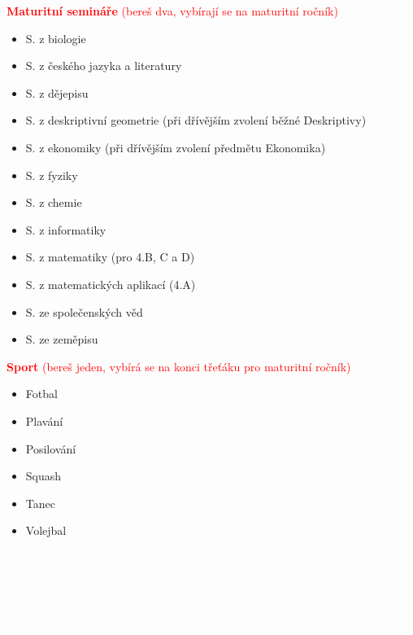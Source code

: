 \documentclass{article}
\begin{document}
\begin{multicols}{2}
  \vfill\null

  \columnbreak

  \noindent \textcolor{red}{\textbf{Maturitní semináře} (bereš dva, vybírají se na maturitní ročník)}
  \begin{itemize}
    \item S. z biologie
    \item S. z českého jazyka a literatury
    \item S. z dějepisu
    \item S. z deskriptivní geometrie (při
    dřívějším zvolení běžné Deskriptivy)
    \item S. z ekonomiky (při dřívějším zvolení předmětu Ekonomika)
    \item S. z fyziky
    \item S. z chemie
    \item S. z informatiky
    \item S. z matematiky (pro 4.B, C a D)
    \item S. z matematických aplikací (4.A)
    \item S. ze společenských věd
    \item S. ze zeměpisu
  \end{itemize}

  \noindent \textcolor{red}{\textbf{Sport} (bereš jeden, vybírá se na konci třeťáku pro maturitní ročník)}
  \begin{itemize}
    \item Fotbal
    \item Plavání
    \item Posilování
    \item Squash
    \item Tanec
    \item Volejbal
  \end{itemize}

  \begin{tcolorbox}[colback=red,boxrule=0pt, sharp corners]
    \textcolor{white}{\footnotesize Poznámky:
     některé předměty jsou označeny pro třídy X.A
      nebo ostatní. Osnovy matematické a všeobecné třídy se trochu liší, a proto jim musí být
      uzpůsoben i repertoár volitelných předmětů.
      Výčet předmětů nemusí být kompletní:
      neustále se snažíme vymýšlet nové smysluplné
      předměty -- hlavně do čtvrťáku. A některé ze
      seznamu se vůbec nemusejí otevřít.}

      \hfill
\end{tcolorbox}
\end{multicols}
\end{document}
